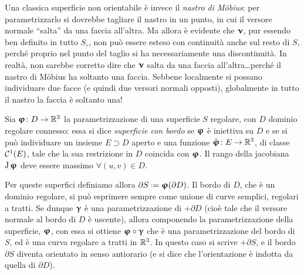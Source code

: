 Una classica superficie non orientabile è invece il \emph{nastro di M\"obius}: per parametrizzarlo si dovrebbe tagliare il nastro in un punto, in cui il versore normale ``salta'' da una faccia all'altra.
Ma allora è evidente che $\bm{\upnu}$, pur essendo ben definito in tutto $S_\circ$, non può essere esteso con continuità anche sul resto di $S$, perch\'e proprio nel punto del taglio si ha necessariamente una discontinuità.
In realtà, non sarebbe corretto dire che $\bm{\upnu}$ salta da una faccia all'altra\dots perch\'e il nastro di M\"obius ha soltanto una faccia.
Sebbene localmente si possano individuare due facce (e quindi due versori normali opposti), globalmente in tutto il nastro la faccia è soltanto una!

\begin{definizione} \label{d:superfici-con-bordo}
	Sia $\bm{\upvarphi}\colon D\to\mathbb{R}^3$ la parametrizzazione di una superficie $S$ regolare, con $D$ dominio regolare connesso: essa si dice \emph{superficie con bordo} se $\bm{\upvarphi}$ è iniettiva su $D$ e se si può individuare un insieme $E\supset D$ aperto e una funzione $\tilde{\bm{\upvarphi}}\colon E\to\mathbb{R}^3$, di classe $\mathcal{C}^{{1}}(E)$, tale che la sua restrizione in $D$ coincida con $\bm{\upvarphi}$. Il rango della jacobiana $\operatorname{J}\bm{\upvarphi}$ deve essere massimo $\forall (u,v)\in D$.
\end{definizione}
Per queste superfici definiamo allora $\partial S\defeq\vphi(\partial D)$.
Il bordo di $D$, che è un dominio regolare, si può esprimere sempre come unione di curve semplici, regolari a tratti.
Se dunque $\bm{\upgamma}$ è una parametrizzazione di $+\partial D$ (cioè tale che il versore normale al bordo di $D$ è uscente), allora componendo la parametrizzazione della superficie, $\bm{\upvarphi}$, con essa si ottiene $\bm{\upvarphi}\circ\bm{\upgamma}$ che è una parametrizzazione del bordo di $S$, ed è una curva regolare a tratti in $\mathbb{R}^3$.
In questo caso si scrive $+\partial S$, e il bordo $\partial S$ diventa orientato in senso antiorario (e si dice che l'orientazione è indotta da quella di $\partial D$).

